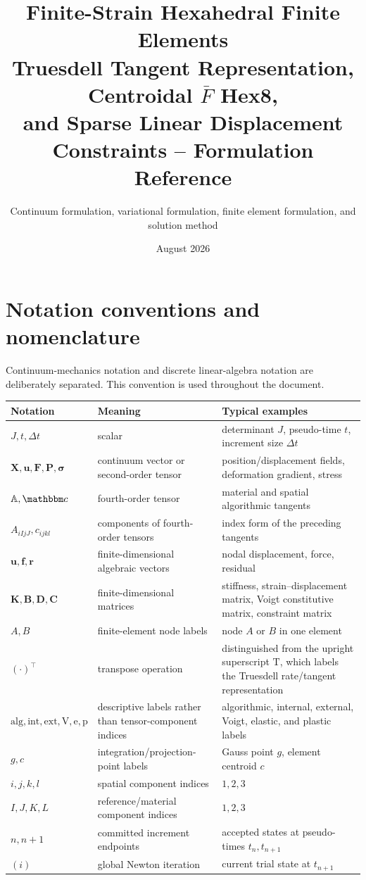\documentclass[11pt,a4paper]{article}
\title{Finite-Strain Hexahedral Finite Elements\\
Truesdell Tangent Representation, Centroidal $\bar F$ Hex8,\\
and Sparse Linear Displacement Constraints -- Formulation Reference}
\author{Continuum formulation, variational formulation, finite element formulation, and solution method}
\date{August 2026}
\newcommand{\bs}[1]{\boldsymbol{#1}}
\newcommand{\vct}[1]{\mathbf{#1}}
\begin{document}
\maketitle
\begingroup\sloppy\hfuzz=40pt
\tableofcontents
\endgroup
\newpage

\section{Notation conventions and nomenclature}
\label{sec:nomenclature}

Continuum-mechanics notation and discrete linear-algebra notation are deliberately separated. This convention is used throughout the document.

\begin{center}
\begin{tabular}{>{\raggedright\arraybackslash}p{3.1cm}>{\raggedright\arraybackslash}p{5.0cm}>{\raggedright\arraybackslash}p{5.0cm}}
\toprule
Notation & Meaning & Typical examples \\
\midrule
$J,t,\Delta t$ & scalar & determinant $J$, pseudo-time $t$, increment size $\Delta t$ \\
$\bs X,\bs u,\bs F,\bs P,\bs\sigma$ & continuum vector or second-order tensor & position/displacement fields, deformation gradient, stress \\
$\mathbb A,\mathbbm c$ & fourth-order tensor & material and spatial algorithmic tangents \\
$A_{iIjJ},c_{ijkl}$ & components of fourth-order tensors & index form of the preceding tangents \\
$\vct u,\vct f,\vct r$ & finite-dimensional algebraic vectors & nodal displacement, force, residual \\
$\vct K,\vct B,\vct D,\vct C$ & finite-dimensional matrices & stiffness, strain--displacement matrix, Voigt constitutive matrix, constraint matrix \\
$A,B$ & finite-element node labels & node $A$ or $B$ in one element \\
$({\cdot})^\top$ & transpose operation & distinguished from the upright superscript $\mathrm T$, which labels the Truesdell rate/tangent representation \\
$\mathrm{alg},\mathrm{int},\mathrm{ext},\mathrm V,\mathrm e,\mathrm p$ & descriptive labels rather than tensor-component indices & algorithmic, internal, external, Voigt, elastic, and plastic labels \\
$g,c$ & integration/projection-point labels & Gauss point $g$, element centroid $c$ \\
$i,j,k,l$ & spatial component indices & $1,2,3$ \\
$I,J,K,L$ & reference/material component indices & $1,2,3$ \\
$n,n+1$ & committed increment endpoints & accepted states at pseudo-times $t_n,t_{n+1}$ \\
$(i)$ & global Newton iteration & current trial state at $t_{n+1}$ \\
\bottomrule
\end{tabular}
\end{center}
\end{document}
